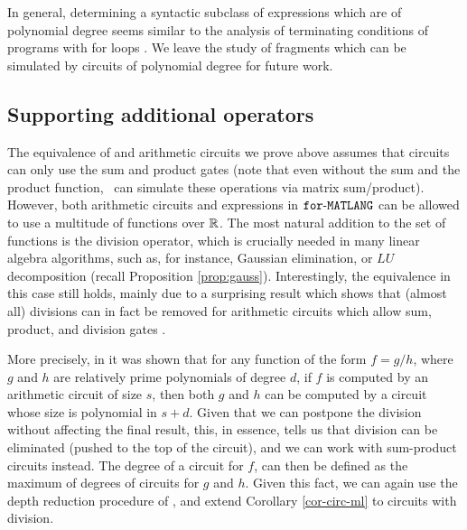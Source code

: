 In general, determining a syntactic subclass of \langfor expressions which are of polynomial degree seems similar to the analysis of terminating conditions of programs with for loops \cite{florisKnows?}. We leave the study of \langfor fragments which can be simulated by circuits of polynomial degree for future work.


\subsection{Supporting additional operators}

%
%
%

The equivalence of \langfor and arithmetic circuits we prove above assumes that circuits can only use the sum and product gates (note that even without the sum and the product function, \langfor\ can simulate these operations via matrix sum/product). However, both arithmetic circuits and expressions in $\texttt{for}\text{-}\texttt{MATLANG}$ can be allowed to use a multitude of functions over $\mathbb{R}$. The most natural addition to the set of functions is the division operator, which is crucially needed in many linear algebra algorithms, such as, for instance, Gaussian elimination, or $LU$ decomposition (recall Proposition \ref{prop:gauss}).
Interestingly, the equivalence in this case still holds, mainly due to a surprising result which shows that (almost all) divisions can in fact be removed for arithmetic circuits which allow sum, product, and division gates \cite{allender}.

More precisely, in \cite{strassen1973vermeidung,borodin1982fast,kaltofen1988greatest} it was shown that for any function of the form $f = g/h$, where $g$ and $h$ are relatively prime polynomials of degree $d$, if $f$ is computed by an arithmetic circuit of size $s$, then both $g$ and $h$ can be computed by a circuit whose size is polynomial in $s + d$. Given that we can postpone the division without affecting the final result, this, in essence, tells us that division can be eliminated (pushed to the top of the circuit), and we can work with sum-product circuits instead. The degree of a circuit for $f$, can then be defined as the maximum of degrees of circuits for $g$ and $h$. Given this fact, we can again use the depth reduction procedure of \cite{AllenderJMV98}, and extend Corollary \ref{cor-circ-ml} to circuits with division.

